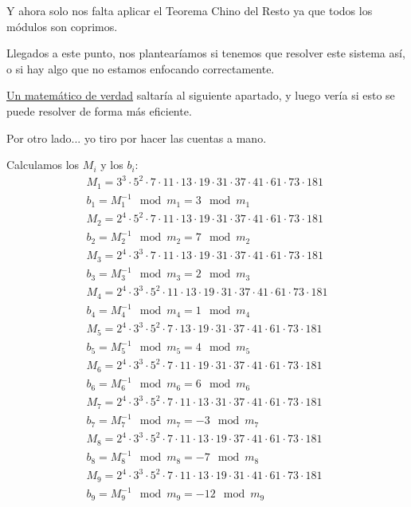 \begin{problem} [9]
\begin{enumerate}
Y ahora solo nos falta aplicar el Teorema Chino del Resto ya que todos los módulos son coprimos.

Llegados a este punto, nos plantearíamos si tenemos que resolver este sistema así, o si hay algo que no estamos enfocando correctamente.

\underline{Un matemático de verdad} saltaría al siguiente apartado, y luego vería si esto se puede resolver de forma más eficiente.

Por otro lado... yo tiro por hacer las cuentas a mano.

Calculamos los $M_i$ y los $b_i$:
\begin{align*}
M_{1} = 3^3\cdot5^2\cdot7\cdot11\cdot13\cdot19\cdot31\cdot37\cdot41\cdot61\cdot73\cdot181\\
b_{1} = M_{1}^{-1} \mod m_{1} = 3 \mod m_{1}\\
M_{2} = 2^4\cdot5^2\cdot7\cdot11\cdot13\cdot19\cdot31\cdot37\cdot41\cdot61\cdot73\cdot181\\
b_{2} = M_{2}^{-1} \mod m_{2} = 7 \mod m_{2}\\
M_{3} = 2^4\cdot3^3\cdot7\cdot11\cdot13\cdot19\cdot31\cdot37\cdot41\cdot61\cdot73\cdot181\\
b_{3} = M_{3}^{-1} \mod m_{3} = 2 \mod m_{3}\\
M_{4} = 2^4\cdot3^3\cdot5^2\cdot11\cdot13\cdot19\cdot31\cdot37\cdot41\cdot61\cdot73\cdot181\\
b_{4} = M_{4}^{-1} \mod m_{4} = 1 \mod m_{4}\\
M_{5} = 2^4\cdot3^3\cdot5^2\cdot7\cdot13\cdot19\cdot31\cdot37\cdot41\cdot61\cdot73\cdot181\\
b_{5} = M_{5}^{-1} \mod m_{5} = 4 \mod m_{5}\\
M_{6} = 2^4\cdot3^3\cdot5^2\cdot7\cdot11\cdot19\cdot31\cdot37\cdot41\cdot61\cdot73\cdot181\\
b_{6} = M_{6}^{-1} \mod m_{6} = 6 \mod m_{6}\\
M_{7} = 2^4\cdot3^3\cdot5^2\cdot7\cdot11\cdot13\cdot31\cdot37\cdot41\cdot61\cdot73\cdot181\\
b_{7} = M_{7}^{-1} \mod m_{7} = -3 \mod m_{7}\\
M_{8} = 2^4\cdot3^3\cdot5^2\cdot7\cdot11\cdot13\cdot19\cdot37\cdot41\cdot61\cdot73\cdot181\\
b_{8} = M_{8}^{-1} \mod m_{8} = -7 \mod m_{8}\\
M_{9} = 2^4\cdot3^3\cdot5^2\cdot7\cdot11\cdot13\cdot19\cdot31\cdot41\cdot61\cdot73\cdot181\\
b_{9} = M_{9}^{-1} \mod m_{9} = -12 \mod m_{9}\\

\end{align*}
\end{enumerate}
\end{problem}
